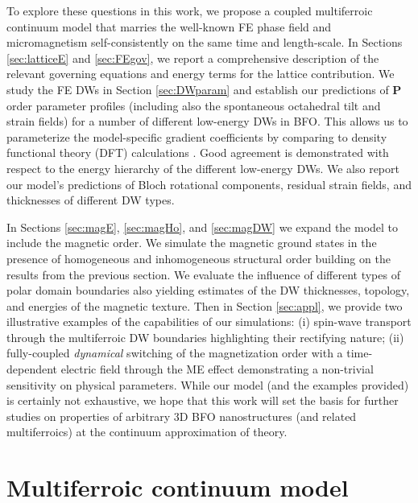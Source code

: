 \documentclass[%
 reprint,
superscriptaddress,
 amsmath,amssymb,
prb,
]{revtex4-1}
\begin{document}
%
To explore these questions in this work, we propose a coupled multiferroic continuum model that marries the well-known FE phase field and micromagnetism self-consistently on the same time and length-scale.
%
In Sections \ref{sec:latticeE} and \ref{sec:FEgov}, we report a comprehensive description of the relevant governing equations and energy terms for the lattice contribution.
%
We study the FE DWs in Section \ref{sec:DWparam} and establish our predictions of $\mathbf{P}$ order parameter profiles (including also the spontaneous octahedral tilt and strain fields) for a number of different low-energy DWs in BFO.
%
This allows us to parameterize the model-specific gradient coefficients by comparing to density functional theory (DFT) calculations \cite{Dieguez2013}. %
%
Good agreement is demonstrated with respect to the energy hierarchy of the different low-energy DWs.
%
We also report our model's predictions of Bloch rotational components, residual strain fields, and thicknesses of different DW types. 
%

%
In Sections \ref{sec:magE}, \ref{sec:magHo}, and \ref{sec:magDW} we expand the model to include the magnetic order. 
%
We simulate the magnetic ground states in the presence of homogeneous and inhomogeneous structural order building on the results from the previous section.
%
We evaluate the influence of different types of polar domain boundaries also yielding estimates of the DW thicknesses, topology, and energies of the magnetic texture.
%
Then in Section \ref{sec:appl}, we provide two illustrative examples of the capabilities of our simulations: (i) spin-wave transport through the multiferroic DW boundaries highlighting their rectifying nature; (ii) fully-coupled \emph{dynamical} switching of the magnetization order with a time-dependent electric field through the ME effect demonstrating a non-trivial sensitivity on physical parameters. 
%
While our model (and the examples provided) is certainly not exhaustive, we hope that this work will set the basis for further studies on properties of arbitrary 3D BFO nanostructures (and related multiferroics) at the continuum approximation of theory.
%

%
\section{Multiferroic continuum model}\label{sec:model}
%
\end{document}
